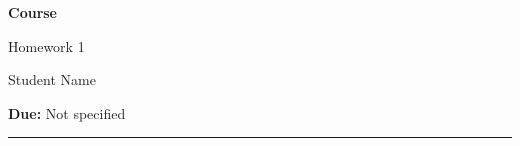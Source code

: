 \documentclass[11pt]{article}
\newcommand{\studentname}{Student Name}
\newcommand{\coursename}{Course}
\newcommand{\termname}{}
\newcommand{\assignmentname}{Homework 1}
\newcommand{\duedate}{Not specified}
\newcommand{\assignmentfile}{homework/homework-01}
\begin{document}
\begin{center}
  {\Large\bfseries \coursename}\par
  \vspace{0.25em}
  {\large \assignmentname}\par
  \vspace{0.75em}
  \studentname
  \ifx\termname\empty\else\hfill\termname\fi
  \par
  \vspace{0.25em}
  \textbf{Due:} \duedate
\end{center}

\hrule
\vspace{1em}


\end{document}
